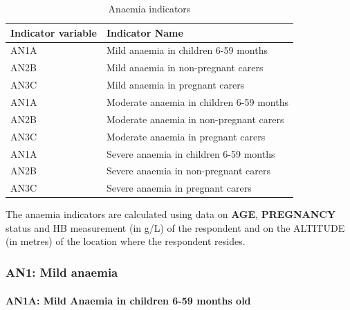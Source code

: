 \documentclass[12pt,a4paper]{article}
\let\oldparagraph\paragraph
\renewcommand{\paragraph}[1]{\oldparagraph{#1}\mbox{}}
\begin{document}
\begin{table}[H]

\caption{\label{tab:anaemia1}Anaemia indicators}
\centering
\begin{tabular}[t]{ll}
\toprule
\textbf{Indicator variable} & \textbf{Indicator Name}\\
\midrule
\rowcolor{gray!6}  AN1A & Mild anaemia in children 6-59 months\\
AN2B & Mild anaemia in non-pregnant carers\\
\rowcolor{gray!6}  AN3C & Mild anaemia in pregnant carers\\
AN1A & Moderate anaemia in children 6-59 months\\
\rowcolor{gray!6}  AN2B & Moderate anaemia in non-pregnant carers\\
\addlinespace
AN3C & Moderate anaemia in pregnant carers\\
\rowcolor{gray!6}  AN1A & Severe anaemia in children 6-59 months\\
AN2B & Severe anaemia in non-pregnant carers\\
\rowcolor{gray!6}  AN3C & Severe anaemia in pregnant carers\\
\bottomrule
\end{tabular}
\end{table}

The anaemia indicators are calculated using data on \textbf{AGE}, \textbf{PREGNANCY} status and HB measurement (in g/L) of the respondent and on the ALTITUDE (in metres) of the location where the respondent resides.

\newpage

\hypertarget{an1-mild-anaemia}{%
\subsubsection{AN1: Mild anaemia}\label{an1-mild-anaemia}}

\hypertarget{an1a-mild-anaemia-in-children-6-59-months-old}{%
\paragraph{AN1A: Mild Anaemia in children 6-59 months old}\label{an1a-mild-anaemia-in-children-6-59-months-old}}
\end{document}
